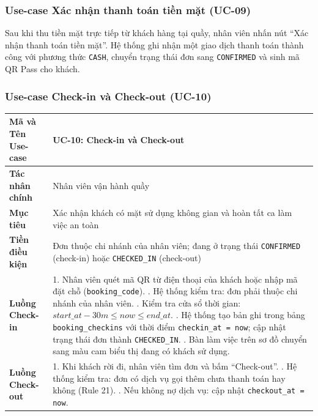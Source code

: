 \subsubsection{Use-case Xác nhận thanh toán tiền mặt (UC-09)}
Sau khi thu tiền mặt trực tiếp từ khách hàng tại quầy, nhân viên nhấn nút ``Xác nhận thanh toán tiền mặt''. Hệ thống ghi nhận một giao dịch thanh toán thành công với phương thức \texttt{CASH}, chuyển trạng thái đơn sang \texttt{CONFIRMED} và sinh mã QR Pass cho khách.

\subsubsection{Use-case Check-in và Check-out (UC-10)}
\begin{table}[H]
\centering
\small
\renewcommand{\arraystretch}{1.2}
\begin{tabular}{|p{3.6cm}|p{10.4cm}|}
\hline
\textbf{Mã và Tên Use-case} & \textbf{UC-10: Check-in và Check-out} \\ \hline
\textbf{Tác nhân chính} & Nhân viên vận hành quầy \\ \hline
\textbf{Mục tiêu} & Xác nhận khách có mặt sử dụng không gian và hoàn tất ca làm việc an toàn \\ \hline
\textbf{Tiền điều kiện} & Đơn thuộc chi nhánh của nhân viên; đang ở trạng thái \texttt{CONFIRMED} (check-in) hoặc \texttt{CHECKED\_IN} (check-out) \\ \hline
\textbf{Luồng Check-in} & 
1. Nhân viên quét mã QR từ điện thoại của khách hoặc nhập mã đặt chỗ (\texttt{booking\_code}). \newline
2. Hệ thống kiểm tra: đơn phải thuộc chi nhánh của nhân viên. \newline
3. Kiểm tra cửa sổ thời gian: $start\_at - 30m \le now \le end\_at$. \newline
4. Hệ thống tạo bản ghi trong bảng \texttt{booking\_checkins} với thời điểm \texttt{checkin\_at = now}; cập nhật trạng thái đơn thành \texttt{CHECKED\_IN}. \newline
5. Bàn làm việc trên sơ đồ chuyển sang màu cam biểu thị đang có khách sử dụng. \\ \hline
\textbf{Luồng Check-out} & 
1. Khi khách rời đi, nhân viên tìm đơn và bấm ``Check-out''. \newline
2. Hệ thống kiểm tra: đơn có dịch vụ gọi thêm chưa thanh toán hay không (Rule 21). \newline
3. Nếu không nợ dịch vụ: cập nhật \texttt{checkout\_at = now}. \newline

\end{tabular}
\end{table}
